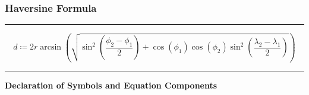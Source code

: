 \documentclass[
  12pt,
]{article}
\begin{document}
\hypertarget{haversine-formula}{%
\subsubsection{Haversine Formula}\label{haversine-formula}}

\rule{1\linewidth}{0.5pt}

\begin{equation}\label{haversine_formula}
d \coloneqq 2r\arcsin\left(\sqrt{\sin^2\left(\frac{\phi_2-\phi_1}{2}\right) + \cos(\phi_1)\cos(\phi_2)\sin^2\left(\frac{\lambda_2-\lambda_1}{2}\right)}\right)
\end{equation}

\citet{Dauni.2019}

\rule{1\linewidth}{0.5pt}

\vspace{0.5cm}

\begin{center}
\textbf{Declaration of Symbols and Equation Components}
\end{center}
\end{document}
